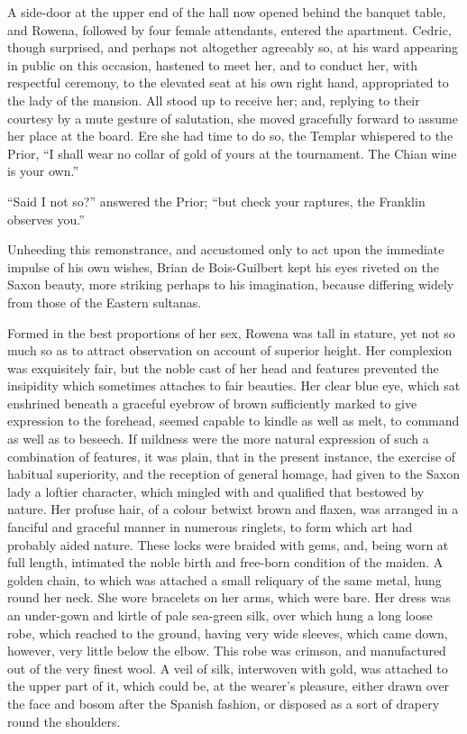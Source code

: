 A side-door at the upper end of the hall now opened behind the banquet
table, and Rowena, followed by four female attendants, entered the
apartment. Cedric, though surprised, and perhaps not altogether
agreeably so, at his ward appearing in public on this occasion, hastened
to meet her, and to conduct her, with respectful ceremony, to the
elevated seat at his own right hand, appropriated to the lady of the
mansion. All stood up to receive her; and, replying to their courtesy by
a mute gesture of salutation, she moved gracefully forward to assume her
place at the board. Ere she had time to do so, the Templar whispered to
the Prior, ``I shall wear no collar of gold of yours at the tournament.
The Chian wine is your own.''

``Said I not so?'' answered the Prior; ``but check your raptures, the
Franklin observes you.''

Unheeding this remonstrance, and accustomed only to act upon the
immediate impulse of his own wishes, Brian de Bois-Guilbert kept his
eyes riveted on the Saxon beauty, more striking perhaps to his
imagination, because differing widely from those of the Eastern
sultanas.

Formed in the best proportions of her sex, Rowena was tall in stature,
yet not so much so as to attract observation on account of superior
height. Her complexion was exquisitely fair, but the noble cast of her
head and features prevented the insipidity which sometimes attaches to
fair beauties. Her clear blue eye, which sat enshrined beneath a
graceful eyebrow of brown sufficiently marked to give expression to the
forehead, seemed capable to kindle as well as melt, to command as well
as to beseech. If mildness were the more natural expression of such a
combination of features, it was plain, that in the present instance, the
exercise of habitual superiority, and the reception of general homage,
had given to the Saxon lady a loftier character, which mingled with and
qualified that bestowed by nature. Her profuse hair, of a colour betwixt
brown and flaxen, was arranged in a fanciful and graceful manner in
numerous ringlets, to form which art had probably aided nature. These
locks were braided with gems, and, being worn at full length, intimated
the noble birth and free-born condition of the maiden. A golden chain,
to which was attached a small reliquary of the same metal, hung round
her neck. She wore bracelets on her arms, which were bare. Her dress was
an under-gown and kirtle of pale sea-green silk, over which hung a long
loose robe, which reached to the ground, having very wide sleeves, which
came down, however, very little below the elbow. This robe was crimson,
and manufactured out of the very finest wool. A veil of silk, interwoven
with gold, was attached to the upper part of it, which could be, at the
wearer's pleasure, either drawn over the face and bosom after the
Spanish fashion, or disposed as a sort of drapery round the shoulders.

